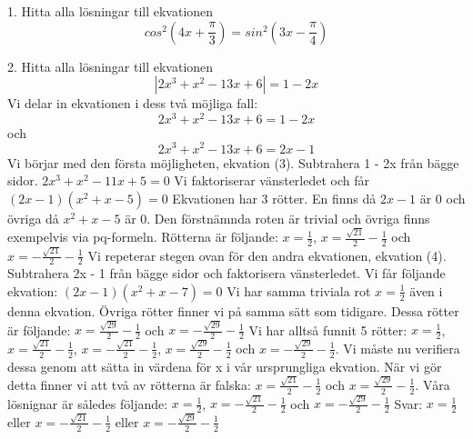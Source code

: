 \documentclass{article}
\begin{document}
  1. Hitta alla lösningar till ekvationen
  \begin{equation}
      cos^2(4x + \frac{\pi}{3}) = sin^2(3x-\frac{\pi}{4})
  \end{equation}
  
  2. Hitta alla lösningar till ekvationen
  \begin{equation}
      |2x^3 + x^2 - 13x + 6| = 1 - 2x
  \end{equation}
  Vi delar in ekvationen i dess två möjliga fall:
  \begin{equation}
      2x^3 + x^2 - 13x + 6 = 1 - 2x
  \end{equation}
  och 
  \begin{equation}
      2x^3 + x^2 - 13x + 6 = 2x - 1
  \end{equation}
  Vi börjar med den första möjligheten, ekvation (3). Subtrahera 1 - 2x från bägge sidor.
  \newline \newline
  $2x^3 + x^2 - 11x + 5 = 0$
  \newline \newline
  Vi faktoriserar vänsterledet och får
  \newline \newline
  $(2x - 1)(x^2 + x - 5) = 0$
  \newline \newline
  Ekvationen har 3 rötter. En finns då $2x - 1$ är 0 och övriga då $x^2 + x - 5$ är 0. Den förstnämnda roten är trivial och övriga finns exempelvis via pq-formeln. Rötterna är följande: $x = \frac{1}{2}$, $x = \frac{\sqrt{21}}{2} - \frac{1}{2}$ och $x = -\frac{\sqrt{21}}{2} - \frac{1}{2}$
  \newline \newline
  Vi repeterar stegen ovan för den andra ekvationen, ekvation (4). Subtrahera 2x - 1 från bägge sidor och faktorisera vänsterledet. Vi får följande ekvation:
  \newline \newline
  $(2x - 1)(x^2 + x - 7) = 0$
  \newline \newline
  Vi har samma triviala rot $x = \frac{1}{2}$ även i denna ekvation. Övriga rötter finner vi på samma sätt som tidigare. Dessa rötter är följande: $x = \frac{\sqrt{29}}{2} - \frac{1}{2}$ och $x = -\frac{\sqrt{29}}{2} - \frac{1}{2}$
  \newline \newline
  Vi har alltså funnit 5 rötter: $x = \frac{1}{2}$, $x = \frac{\sqrt{21}}{2} - \frac{1}{2}$, $x = -\frac{\sqrt{21}}{2} - \frac{1}{2}$, $x = \frac{\sqrt{29}}{2} - \frac{1}{2}$ och $x = -\frac{\sqrt{29}}{2} - \frac{1}{2}$. Vi måste nu verifiera dessa genom att sätta in värdena för x i vår ursprungliga ekvation. När vi gör detta finner vi att två av rötterna är falska: $x = \frac{\sqrt{21}}{2} - \frac{1}{2}$ och $x = \frac{\sqrt{29}}{2} - \frac{1}{2}$. Våra lösnignar är således följande: $x = \frac{1}{2}$, $x = -\frac{\sqrt{21}}{2} - \frac{1}{2}$ och $x = -\frac{\sqrt{29}}{2} - \frac{1}{2}$
  \newline \newline
  Svar: $x = \frac{1}{2}$ eller $x = -\frac{\sqrt{21}}{2} - \frac{1}{2}$ eller $x = -\frac{\sqrt{29}}{2} - \frac{1}{2}$
  
\end{document}
